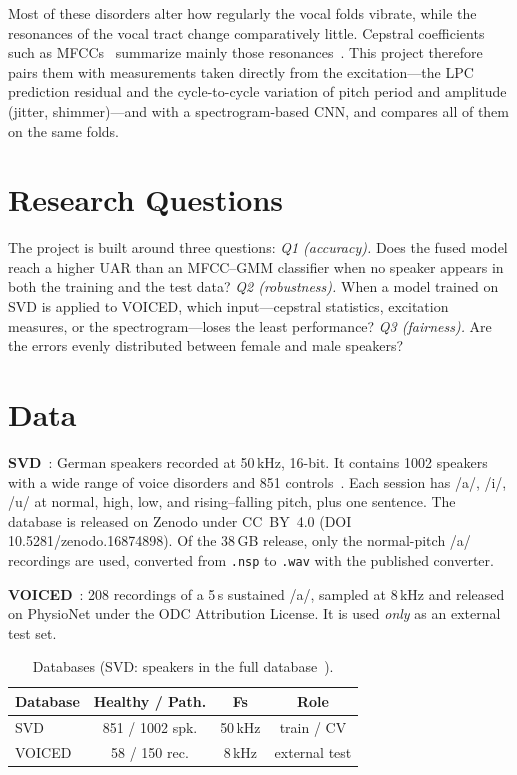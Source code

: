 \documentclass[conference]{IEEEtran}
\begin{document}
Most of these disorders alter how regularly the vocal folds vibrate, while the resonances of the vocal tract change comparatively little. Cepstral coefficients such as MFCCs~\cite{davis1980} summarize mainly those resonances~\cite{rabiner2007}. This project therefore pairs them with measurements taken directly from the excitation---the LPC prediction residual and the cycle-to-cycle variation of pitch period and amplitude (jitter, shimmer)---and with a spectrogram-based CNN, and compares all of them on the same folds.

\section{Research Questions}
The project is built around three questions:
\textit{Q1 (accuracy).} Does the fused model reach a higher UAR than an MFCC--GMM classifier when no speaker appears in both the training and the test data?
\textit{Q2 (robustness).} When a model trained on SVD is applied to VOICED, which input---cepstral statistics, excitation measures, or the spectrogram---loses the least performance?
\textit{Q3 (fairness).} Are the errors evenly distributed between female and male speakers?

\section{Data}
\textbf{SVD}~\cite{svd,puetzer2008}: German speakers recorded at 50\,kHz, 16-bit. It contains 1002 speakers with a wide range of voice disorders and 851 controls~\cite{huckvale2021}. Each session has /a/, /i/, /u/ at normal, high, low, and rising--falling pitch, plus one sentence. The database is released on Zenodo under CC~BY~4.0 (DOI 10.5281/zenodo.16874898). Of the 38\,GB release, only the normal-pitch /a/ recordings are used, converted from \texttt{.nsp} to \texttt{.wav} with the published converter.

\textbf{VOICED}~\cite{voiced2018}: 208 recordings of a 5\,s sustained /a/, sampled at 8\,kHz and released on PhysioNet under the ODC Attribution License. It is used \emph{only} as an external test set.

\begin{table}[h]
\caption{Databases (SVD: speakers in the full database~\cite{huckvale2021}).}
\label{tab:data}
\centering
\begin{tabular}{lccc}
\hline
Database & Healthy / Path. & Fs & Role \\
\hline
SVD & 851 / 1002 spk. & 50\,kHz & train / CV \\
VOICED & 58 / 150 rec. & 8\,kHz & external test \\
\hline
\end{tabular}
\end{table}
\end{document}
